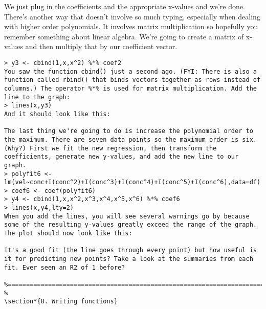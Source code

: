 {We just plug in the coefficients and the appropriate x-values and we're done. There's another way that doesn't involve so much typing, especially when dealing with higher order polynomials. It involves matrix multiplication so hopefully you remember something about linear algebra. We're going to create a matrix of x-values and then multiply that by our coefficient vector. 
\begin{framed}
\begin{verbatim}
> y3 <- cbind(1,x,x^2) %*% coef2
You saw the function cbind() just a second ago. (FYI: There is also a function called rbind() that binds vectors together as rows instead of columns.) The operator %*% is used for matrix multiplication. Add the line to the graph: 
> lines(x,y3)
And it should look like this: 

The last thing we're going to do is increase the polynomial order to the maximum. There are seven data points so the maximum order is six. (Why?) First we fit the new regression, then transform the coefficients, generate new y-values, and add the new line to our graph. 
> polyfit6 <- lm(vel~conc+I(conc^2)+I(conc^3)+I(conc^4)+I(conc^5)+I(conc^6),data=df)
> coef6 <- coef(polyfit6)
> y4 <- cbind(1,x,x^2,x^3,x^4,x^5,x^6) %*% coef6
> lines(x,y4,lty=2)
When you add the lines, you will see several warnings go by because some of the resulting y-values greatly exceed the range of the graph. The plot should now look like this: 

It's a good fit (the line goes through every point) but how useful is it for predicting new points? Take a look at the summaries from each fit. Ever seen an R2 of 1 before? 

%======================================================================================================== %
\section*{8. Writing functions}



\end{verbatim}
\end{framed}}
